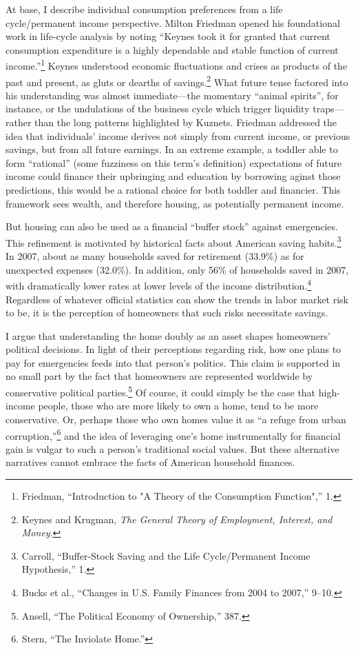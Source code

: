 \documentclass[
]{article}
\begin{document}
At base, I describe individual consumption preferences from a life cycle/permanent income perspective.
Milton Friedman opened his foundational work in life-cycle analysis by noting ``Keynes took it for granted that current consumption expenditure is a highly dependable and stable function of current income.''\footnote{Friedman, ``Introduction to "A Theory of the Consumption Function",'' 1.}
Keynes understood economic fluctuations and crises as products of the past and present, as gluts or dearths of savings.\footnote{Keynes and Krugman, \emph{The General Theory of Employment, Interest, and Money}.}
What future tense factored into his understanding was almost immediate---the momentary ``animal spirits'', for instance, or the undulations of the business cycle which trigger liquidity traps---rather than the long patterns highlighted by Kuznets.
Friedman addressed the idea that individuals' income derives not simply from current income, or previous savings, but from all future earnings.
In an extreme example, a toddler able to form ``rational'' (some fuzziness on this term's definition) expectations of future income could finance their upbringing and education by borrowing aginst those predictions, this would be a rational choice for both toddler and financier.
This framework sees wealth, and therefore housing, as potentially permanent income.

But housing can also be used as a financial ``buffer stock'' against emergencies.
This refinement is motivated by historical facts about American saving habits.\footnote{Carroll, ``Buffer-Stock Saving and the Life Cycle/Permanent Income Hypothesis,'' 1.}
In 2007, about as many households saved for retirement (33.9\%) as for unexpected expenses (32.0\%).
In addition, only 56\% of households saved in 2007, with dramatically lower rates at lower levels of the income distribution.\footnote{Bucks et al., ``Changes in U.S. Family Finances from 2004 to 2007,'' 9--10.}
Regardless of whatever official statistics can show the trends in labor market risk to be, it is the perception of homeowners that such risks necessitate savings.

I argue that understanding the home doubly as an asset shapes homeowners' political decisions.
In light of their perceptions regarding risk, how one plans to pay for emergencies feeds into that person's politics.
This claim is supported in no small part by the fact that homeowners are represented worldwide by conservative political parties.\footnote{Ansell, ``The Political Economy of Ownership,'' 387.}
Of course, it could simply be the case that high-income people, those who are more likely to own a home, tend to be more conservative.
Or, perhaps those who own homes value it as ``a refuge from urban corruption,''\footnote{Stern, ``The Inviolate Home.''} and the idea of leveraging one's home instrumentally for financial gain is vulgar to such a person's traditional social values.
But these alternative narratives cannot embrace the facts of American household finances.
\end{document}

